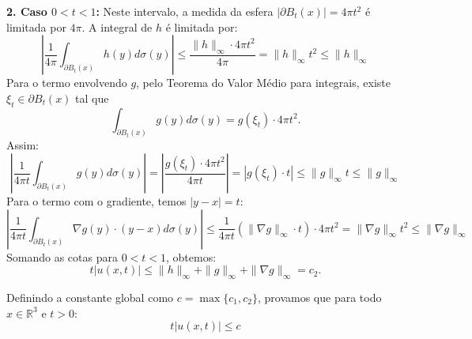\documentclass[cs_edp_2026.1.tex]{subfiles} %
\begin{document}
{	\textbf{2. Caso $0 < t < 1$:}
	Neste intervalo, a medida da esfera $|\partial B_t(x)| = 4\pi t^2$ é limitada por $4\pi$. A integral de $h$ é limitada por:
	$$ \left| \frac{1}{4\pi} \int_{\partial B_t(x)} h(y) d\sigma(y) \right| \le \frac{\|h\|_\infty \cdot 4\pi t^2}{4\pi} = \|h\|_\infty t^2 \le \|h\|_\infty $$
	Para o termo envolvendo $g$, pelo Teorema do Valor Médio para integrais, existe $\xi_t \in \partial B_t(x)$ tal que $$\int_{\partial B_t(x)} g(y) d\sigma(y) = g(\xi_t) \cdot 4\pi t^2.$$ Assim:
	$$ \left| \frac{1}{4\pi t} \int_{\partial B_t(x)} g(y) d\sigma(y) \right| = \left| \frac{g(\xi_t) \cdot 4\pi t^2}{4\pi t} \right| = |g(\xi_t) \cdot t| \le \|g\|_\infty t \le \|g\|_\infty $$
	Para o termo com o gradiente, temos $|y-x|=t$:
	$$ \left| \frac{1}{4\pi t} \int_{\partial B_t(x)} \nabla g(y) \cdot (y - x) d\sigma(y) \right| \le \frac{1}{4\pi t} (\|\nabla g\|_\infty \cdot t) \cdot 4\pi t^2 = \|\nabla g\|_\infty t^2 \le \|\nabla g\|_\infty $$
	Somando as cotas para $0 < t < 1$, obtemos:
	$$ t |u(x, t)| \le \|h\|_\infty + \|g\|_\infty + \|\nabla g\|_\infty = c_2 .$$
	
	Definindo a constante global como $c = \max\{c_1, c_2\}$, provamos que para todo $x \in \mathbb{R}^3$ e $t > 0$:
	$$ \boxed{t |u(x, t)| \le c} $$
}

\end{document}
